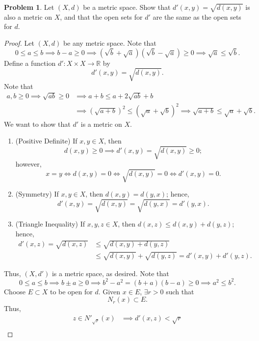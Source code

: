 \documentclass{amsart}
\theoremstyle{definition}
\newtheorem{problem}{Problem}
\begin{document}
\begin{problem}
    Let $(X,d)$ be a metric space. Show that $d'(x,y) = \sqrt{d(x,y)}$ is also a metric on $X$, and that the open sets for $d'$ are the same as the open sets for $d$.
\end{problem}

\begin{proof}
    Let $(X,d)$ be any metric space. Note that
    \[
    0 \leq a \leq b \implies b - a \geq 0 \implies (\sqrt{b} + \sqrt{a})(\sqrt{b} - \sqrt{a}) \geq 0 \implies \sqrt{a} \leq \sqrt{b}.
    \]
    Define a function $d': X \times X \to \mathbb{R}$ by 
    \[
    d'(x,y) = \sqrt{d(x,y)}.
    \]   
    Note that
    \begin{align*}
        a,b \geq 0 \implies \sqrt{ab} \geq 0 &\implies a + b \leq a + 2\sqrt{ab} + b \\
        &\implies (\sqrt{a+b})^2 \leq (\sqrt{a} + \sqrt{b})^2 \implies \sqrt{a+b} \leq \sqrt{a} + \sqrt{b}.
    \end{align*}
    We want to show that $d'$ is a metric on $X$. 
    \begin{enumerate} [label = (\alph*)]
        \item (Positive Definite) If $x,y \in X$, then
        \[
        d(x,y) \geq 0 \implies d'(x,y) = \sqrt{d(x,y)} \geq 0;
        \]
        however,
        \[
        x = y \iff d(x,y) = 0 \iff \sqrt{d(x,y)} = 0 \iff d'(x,y) = 0.
        \]
        \item (Symmetry) If $x,y \in X$, then $d(x,y) = d(y,x)$; hence,
        \[
        d'(x,y) = \sqrt{d(x,y)} = \sqrt{d(y,x)} = d'(y,x).
        \]
        \item (Triangle Inequality) If $x,y,z \in X$, then $d(x,z) \leq d(x,y) + d(y,z)$; hence,
        \begin{align*}
            d'(x,z) = \sqrt{d(x,z)} &\leq \sqrt{d(x,y) + d(y,z)} \\
            &\leq \sqrt{d(x,y)} + \sqrt{d(y,z)} = d'(x,y) + d'(y,z).
        \end{align*}
    \end{enumerate}
    Thus, $(X,d')$ is a metric space, as desired. Note that
    \[
    0 \leq a \leq b \implies b \pm a \geq 0 \implies b^2 - a^2 = (b + a)(b - a) \geq 0 \implies a^2 \leq b^2.
    \]
    Choose $E \subset X$ to be open for $d$. Given $x \in E$, $\exists r > 0$ such that
    \[
    N_r(x) \subset E.
    \]
    Thus,
    \begin{align*}
        z \in N'_{\sqrt{r}}(x) &\implies d'(x,z) < \sqrt{r} \\

\end{align*}
\end{proof}
\end{document}
